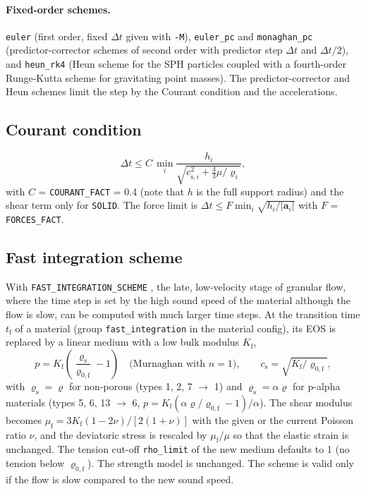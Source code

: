 \documentclass[10pt,fleqn,twoside]{article}
\renewcommand{\vec}[1]{{\mathbf #1}}
\newcommand{\code}[1]{\texttt{#1}}
\newcommand{\sw}[1]{\texttt{#1}}
\begin{document}
\paragraph{Fixed-order schemes.} \code{euler} (first order, fixed $\Delta t$ given with \code{-M}),
\code{euler\_pc} and \code{monaghan\_pc} (predictor-corrector schemes of second order with predictor step $\Delta t$
and $\Delta t/2$), and \code{heun\_rk4} (Heun scheme for the SPH particles coupled with a fourth-order Runge-Kutta
scheme for gravitating point masses). The predictor-corrector and Heun schemes limit the step by the Courant condition
and the accelerations.

\subsection{Courant condition}
\begin{equation}
 \Delta t \leq C\,\min_i \frac{h_i}{\sqrt{c_{\mathrm{s},i}^2 + \frac{4}{3}\mu/\varrho_i}},
\end{equation}
with $C$ = \code{COURANT\_FACT} = 0.4 (note that $h$ is the full support radius) and the shear term only for
\sw{SOLID}. The force limit is $\Delta t \leq F\min_i\sqrt{h_i/|\vec a_i|}$ with $F$ = \code{FORCES\_FACT}.

\subsection{Fast integration scheme}
With \sw{FAST\_INTEGRATION\_SCHEME} \citep{raducan2022,jutzi2022}, the late, low-velocity stage of granular flow,
where the time step is set by the high sound speed of the material although the flow is slow, can be computed with
much larger time steps. At the transition time $t_\mathrm{f}$ of a material (group \code{fast\_integration} in the
material config), its EOS is replaced by a linear medium with a low bulk modulus $K_\mathrm{f}$,
\begin{equation}
 p = K_\mathrm{f}\left(\frac{\varrho_\mathrm{s}}{\varrho_{0,\mathrm{f}}} - 1\right)
  \quad\text{(Murnaghan with $n = 1$)},\qquad c_\mathrm{s} = \sqrt{K_\mathrm{f}/\varrho_{0,\mathrm{f}}},
\end{equation}
with $\varrho_\mathrm{s} = \varrho$ for non-porous (types 1, 2, 7 $\to$ 1) and $\varrho_\mathrm{s} = \alpha\varrho$
for p-alpha materials (types 5, 6, 13 $\to$ 6, $p = K_\mathrm{f}(\alpha\varrho/\varrho_{0,\mathrm{f}} - 1)/\alpha$).
The shear modulus becomes $\mu_\mathrm{f} = 3K_\mathrm{f}(1-2\nu)/[2(1+\nu)]$ with the given or the current Poisson
ratio $\nu$, and the deviatoric stress is rescaled by $\mu_\mathrm{f}/\mu$ so that the elastic strain is unchanged.
The tension cut-off \code{rho\_limit} of the new medium defaults to 1 (no tension below $\varrho_{0,\mathrm{f}}$).
The strength model is unchanged. The scheme is valid only if the flow is slow compared to the new sound speed.
\end{document}
